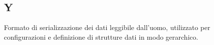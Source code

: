 \begin{center}
\section*{Y}
\end{center}

Formato di serializzazione dei dati leggibile dall’uomo, utilizzato per configurazioni e definizione di strutture dati in modo gerarchico.

